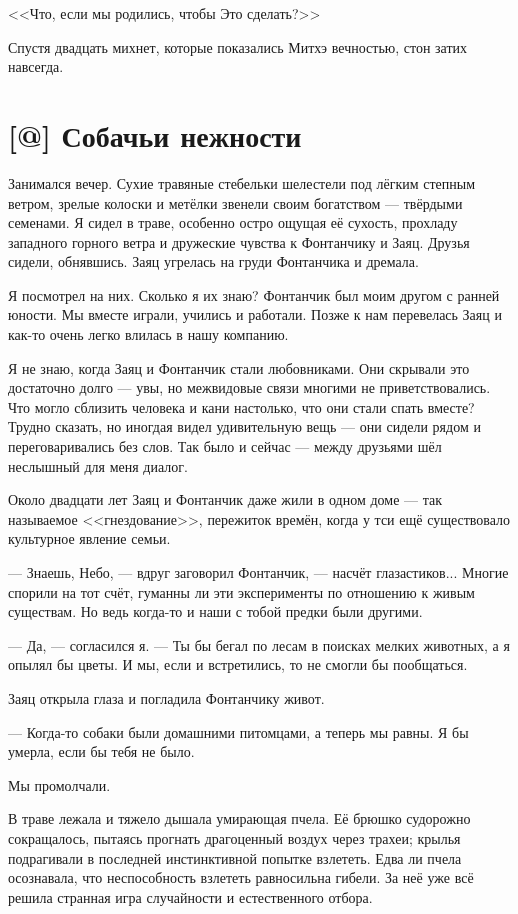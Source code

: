 <<Что, если мы родились, чтобы Это сделать?>>

Спустя двадцать михнет, которые показались Митхэ вечностью, стон затих навсегда.

\section{[@] Собачьи нежности}

Занимался вечер.
Сухие травяные стебельки шелестели под лёгким степным ветром, зрелые колоски и метёлки звенели своим богатством --- твёрдыми семенами.
Я сидел в траве, особенно остро ощущая её сухость, прохладу западного горного ветра и дружеские чувства к Фонтанчику и Заяц.
Друзья сидели, обнявшись.
Заяц угрелась на груди Фонтанчика и дремала.

Я посмотрел на них.
Сколько я их знаю?
Фонтанчик был моим другом с ранней юности.
Мы вместе играли, учились и работали.
Позже к нам перевелась Заяц и как-то очень легко влилась в нашу компанию.

Я не знаю, когда Заяц и Фонтанчик стали любовниками.
Они скрывали это достаточно долго --- увы, но межвидовые связи многими не приветствовались.
Что могло сблизить человека и кани настолько, что они стали спать вместе?
Трудно сказать, но иногдая видел удивительную вещь --- они сидели рядом и переговаривались без слов.
Так было и сейчас --- между друзьями шёл неслышный для меня диалог.

Около двадцати лет Заяц и Фонтанчик даже жили в одном доме --- так называемое <<гнездование>>, пережиток времён, когда у тси ещё существовало культурное явление семьи.

--- Знаешь, Небо, --- вдруг заговорил Фонтанчик, --- насчёт глазастиков...
Многие спорили на тот счёт, гуманны ли эти эксперименты по отношению к живым существам.
Но ведь когда-то и наши с тобой предки были другими.

--- Да, --- согласился я.
--- Ты бы бегал по лесам в поисках мелких животных, а я опылял бы цветы.
И мы, если и встретились, то не смогли бы пообщаться.

Заяц открыла глаза и погладила Фонтанчику живот.

--- Когда-то собаки были домашними питомцами, а теперь мы равны.
Я бы умерла, если бы тебя не было.

Мы промолчали.

В траве лежала и тяжело дышала умирающая пчела.
Её брюшко судорожно сокращалось, пытаясь прогнать драгоценный воздух через трахеи; крылья подрагивали в последней инстинктивной попытке взлететь.
Едва ли пчела осознавала, что неспособность взлететь равносильна гибели.
За неё уже всё решила странная игра случайности и естественного отбора.


